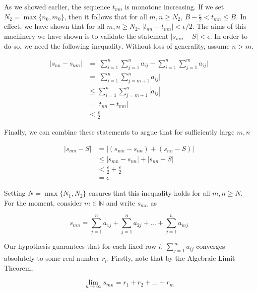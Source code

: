 \documentclass{article}
\begin{document}
As we showed earlier, the sequence $t_{mn}$ is monotone increasing. If we set $N_2 = \max\{n_0, m_0\}$, then it follows that for all $m, n \geq N_2$, $B - \frac{\epsilon}{2} < t_{mn} \leq B$. In effect, we have shown that for all $m, n \geq N_2$, $|t_{nn} - t_{mn}| < \epsilon / 2$. The aims of this machinery we have shown is to validate the statement $|s_{mn} - S| < \epsilon$. In order to do so, we need the following inequality. Without loss of generality, assume $n > m$.

\begin{equation}
\begin{split}
    |s_{nn} - s_{nm}| &= \Bigg|\sum_{i=1}^n \sum_{j=1}^n a_{ij} - \sum_{i=1}^n \sum_{j=1}^m a_{ij}\Bigg| \\
    &= \Bigg|\sum_{i=1}^n \sum_{j=m+1}^n a_{ij}\Bigg| \\
    &\leq \sum_{i=1}^n \sum_{j=m+1}^n |a_{ij}| \\
    &=|t_{nn} - t_{mn}| \\
    &< \frac{\epsilon}{2}
\end{split}
\end{equation}

Finally, we can combine these statements to argue that for sufficiently large $m, n$

\begin{equation}
\begin{split}
    |s_{mn} - S| &= |(s_{mn} - s_{nn}) + (s_{nn} - S)| \\
    &\leq | s_{mn} - s_{nn} | + |s_{nn} - S| \\
    &< \frac{\epsilon}{2} + \frac{\epsilon}{2} \\
    &= \epsilon
\end{split}
\end{equation}

Setting $N = \max \{N_1, N_2\}$ ensures that this inequality holds for all $m, n \geq N$. For the moment, consider $m \in 
\mathbb{N}$ and write $s_{mn}$ as

\begin{equation}
    s_{mn} = \sum_{j=1}^n a_{1j} + \sum_{j=1}^n a_{2j} + \dots + \sum_{j=1}^n a_{mj}
\end{equation}

Our hypothesis guarantees that for each fixed row $i$, $\sum_{j=1}^\infty a_{ij}$ converges absolutely to some real number $r_i$. Firstly, note that by the Algebraic Limit Theorem, 

\begin{equation}
    \lim_{n \to \infty} s_{mn} = r_1 + r_2 + \dots + r_m
\end{equation}
\end{document}

